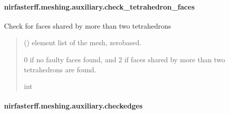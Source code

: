 \documentclass[letterpaper,10pt,english]{sphinxmanual}
\begin{document}
\sphinxstepscope


\paragraph{nirfasterff.meshing.auxiliary.check\_tetrahedron\_faces}
\label{\detokenize{_autosummary/nirfasterff.meshing.auxiliary.check_tetrahedron_faces:nirfasterff-meshing-auxiliary-check-tetrahedron-faces}}\label{\detokenize{_autosummary/nirfasterff.meshing.auxiliary.check_tetrahedron_faces::doc}}

\begin{fulllineitems}
\label{\detokenize{_autosummary/nirfasterff.meshing.auxiliary.check_tetrahedron_faces:nirfasterff.meshing.auxiliary.check_tetrahedron_faces}}
\pysigstartsignatures
{}
\pysigstopsignatures
\sphinxAtStartPar
Check for faces shared by more than two tetrahedrons
\begin{quote}\begin{description}
\sphinxAtStartPar
{} () \textendash{} element list of the mesh, zero\sphinxhyphen{}based.

\sphinxAtStartPar
{} \textendash{} 0 if no faulty faces found, and 2 if faces shared by more than two tetrahedrons are found.

\sphinxAtStartPar
int

\end{description}\end{quote}

\end{fulllineitems}


\sphinxstepscope


\paragraph{nirfasterff.meshing.auxiliary.checkedges}
\label{\detokenize{_autosummary/nirfasterff.meshing.auxiliary.checkedges:nirfasterff-meshing-auxiliary-checkedges}}\label{\detokenize{_autosummary/nirfasterff.meshing.auxiliary.checkedges::doc}}
\end{document}
